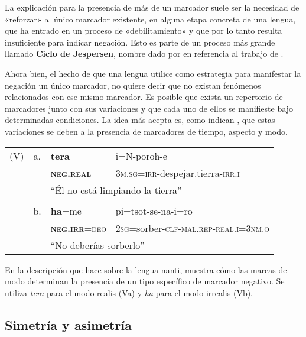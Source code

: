 La explicación para la presencia de más de un marcador suele ser la necesidad de «reforzar» al único marcador existente, en alguna etapa concreta de una lengua, que ha entrado en un proceso de «debilitamiento» y que por lo tanto resulta insuficiente para indicar negación. Esto es parte de un proceso más grande llamado \textbf{Ciclo de Jespersen}, nombre dado por \textcolor{MidnightBlue}{\citet{Dahl1979}} en referencia al trabajo de \textcolor{MidnightBlue}{\citet{Jespersen1917}}.

Ahora bien, el hecho de que una lengua utilice como estrategia para manifestar la negación un único marcador, no quiere decir que no existan fenómenos relacionados con ese mismo marcador. Es posible que exista un repertorio de marcadores junto con sus variaciones y que cada uno de ellos se manifieste bajo determinadas condiciones. La idea más acepta es, como indican \textcolor{MidnightBlue}{\citet{Auwera2020}}, que estas variaciones se deben a la presencia de marcadores de tiempo, aspecto y modo. \vspace{0.5cm}

{\setmainfont{Charis SIL} 
\begin{tabular}{llll}
(V) & a. & \textbf{tera} & i=N-poroh-e \\
& & \textsc{\textbf{neg.real}} & \textsc{3m.sg=irr-}despejar.tierra-\textsc{irr.i} \\
& & \multicolumn{2}{l}{``Él no está limpiando la tierra''} \\
& & & \\
& b. & \textbf{ha}=me & pi=tsot-se-na-i=ro \\
& & \textsc{\textbf{neg.irr}=deo} & \textsc{2sg=}sorber-\textsc{clf-mal.rep-real.i=3nm.o} \\
& & \multicolumn{2}{l}{``No deberías sorberlo''} \\
\end{tabular} \vspace{1cm}
}

En la descripción que hace \textcolor{MidnightBlue}{\citet[pág. 182, 195]{Michael2014}} sobre la lengua nanti, muestra cómo las marcas de modo determinan la presencia de un tipo específico de marcador negativo. Se utiliza {\setmainfont{Charis SIL} \textit{tera}} para el modo realis (Va) y {\setmainfont{Charis SIL} \textit{ha}} para el modo irrealis (Vb).

\subsection*{Simetría y asimetría}

